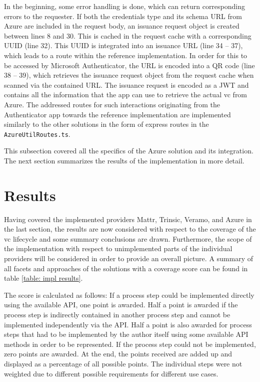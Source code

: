         In the beginning, some error handling is done, which can return corresponding errors to the requester. If both the credentials type and its schema URL from Azure are included in the request body, an issuance request object is created between lines 8 and 30. This is cached in the request cache with a corresponding UUID (line 32). This UUID is integrated into an issuance URL (line 34 – 37), which leads to a route within the reference implementation. In order for this to be accessed by Microsoft Authenticator, the URL is encoded into a QR code (line 38 – 39), which retrieves the issuance request object from the request cache when scanned via the contained URL. The issuance request is encoded as a JWT and contains all the information that the app can use to retrieve the actual \ac{vc} from Azure. The addressed routes for such interactions originating from the Authenticator app towards the reference implementation are implemented similarly to the other solutions in the form of express routes in the \texttt{AzureUtilRoutes.ts}.
        
        This subsection covered all the specifics of the Azure solution and its integration. The next section summarizes the results of the implementation in more detail.

    \section{Results} %
    
    Having covered the implemented providers Mattr, Trinsic, Veramo, and Azure in the last section, the results are now considered with respect to the coverage of the \ac{vc} lifecycle and some summary conclusions are drawn. Furthermore, the scope of the implementation with respect to unimplemented parts of the individual providers will be considered in order to provide an overall picture. A summary of all facets and approaches of the solutions with a coverage score can be found in table \ref{table: impl results}.
     
    The score is calculated as follows: If a process step could be implemented directly using the available API, one point is awarded. Half a point is awarded if the process step is indirectly contained in another process step and cannot be implemented independently via the API. Half a point is also awarded for process steps that had to be implemented by the author itself using some available API methods in order to be represented. If the process step could not be implemented, zero points are awarded. At the end, the points received are added up and displayed as a percentage of all possible points. The individual steps were not weighted due to different possible requirements for different use cases.
    
